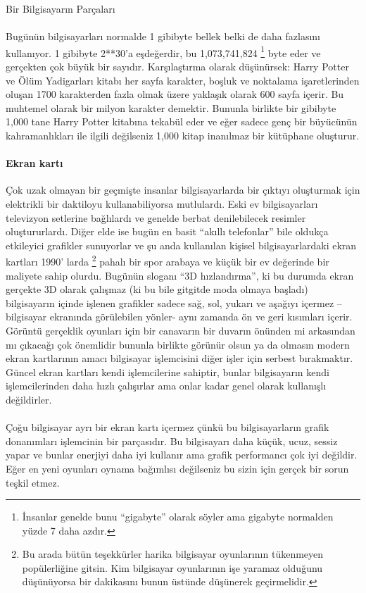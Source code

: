 \documentclass[10pt,a5paper]{book}
\begin{document}
\begin{section}{Bir Bilgisayarın Parçaları}
\paragraph{}{Bugünün bilgisayarları normalde 1 gibibyte bellek belki de daha fazlasını kullanıyor. 1 gibibyte 2**30'a eşdeğerdir, bu 1,073,741,824 
\footnote{İnsanlar genelde bunu “gigabyte” olarak söyler ama gigabyte normalden yüzde 7 daha azdır.}
byte eder ve gerçekten çok büyük bir sayıdır. Karşılaştırma olarak düşünürsek: Harry Potter ve Ölüm Yadigarları kitabı her sayfa karakter, boşluk ve noktalama işaretlerinden oluşan 1700 karakterden fazla olmak üzere yaklaşık olarak 600 sayfa içerir. Bu muhtemel olarak bir milyon karakter demektir. Bununla birlikte bir gibibyte 1,000 tane Harry Potter kitabına tekabül eder ve eğer sadece genç bir büyücünün kahramanlıkları ile ilgili değilseniz 1,000 kitap inanılmaz bir kütüphane oluşturur.}
\paragraph{Ekran kartı}{Çok uzak olmayan bir geçmişte insanlar bilgisayarlarda bir çıktıyı oluşturmak için elektrikli bir daktiloyu kullanabiliyorsa mutlulardı. Eski ev bilgisayarları televizyon setlerine bağlılardı ve genelde berbat denilebilecek resimler oluştururlardı. Diğer elde ise bugün en basit “akıllı telefonlar” bile oldukça etkileyici grafikler sunuyorlar ve şu anda kullanılan kişisel bilgisayarlardaki ekran kartları 1990' larda 
\footnote{Bu arada bütün teşekkürler harika bilgisayar oyunlarının tükenmeyen popülerliğine gitsin. Kim bilgisayar oyunlarının işe yaramaz olduğunu düşünüyorsa bir dakikasını bunun üstünde düşünerek geçirmelidir.}
pahalı bir spor arabaya ve küçük bir ev değerinde bir maliyete sahip olurdu. Bugünün sloganı “3D hızlandırma”, ki bu durumda ekran gerçekte 3D olarak çalışmaz (ki bu bile gitgitde moda olmaya başladı) bilgisayarın içinde işlenen grafikler sadece sağ, sol, yukarı ve aşağıyı içermez – bilgisayar ekranında görülebilen yönler- aynı zamanda ön ve geri kısımları içerir. Görüntü gerçeklik oyunları için bir canavarın bir duvarın önünden mi arkasından mı çıkacağı çok önemlidir bununla birlikte görünür olsun ya da olmasın modern ekran kartlarının amacı bilgisayar işlemcisini diğer işler için serbest bırakmaktır.  Güncel ekran kartları kendi işlemcilerine sahiptir, bunlar bilgisayarın kendi işlemcilerinden daha hızlı çalışırlar ama onlar kadar genel olarak kullanışlı değildirler.}
\paragraph{}{Çoğu bilgisayar ayrı bir ekran kartı içermez çünkü bu bilgisayarların grafik donanımları işlemcinin bir parçasıdır. Bu bilgisayarı daha küçük, ucuz, sessiz yapar ve bunlar enerjiyi daha iyi kullanır ama grafik performancı çok iyi değildir. Eğer en yeni oyunları oynama bağımlısı değilseniz bu sizin için gerçek bir sorun teşkil etmez.}

\end{section}
\end{document}
